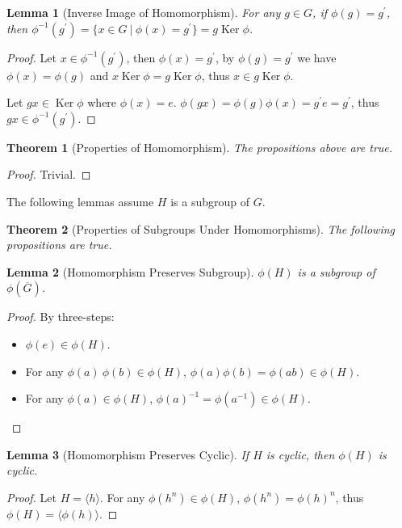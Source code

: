 \documentclass[14pt]{extarticle}
\newtheorem{theorem}{Theorem}[section]
\newtheorem{lemma}{Lemma}[section]
\DeclareMathOperator{\Ker}{Ker}
\newcommand{\inv}[1]{#1^{-1}}
\newcommand{\1}{\{e\}}
\begin{document}
\begin{lemma}[Inverse Image of Homomorphism]
  For any $g \in G$, if $\phi(g) = g^\prime$, 
  then $\inv{\phi}(g^\prime) = \{ x \in G \ | \ \phi(x) = g^\prime \} = g \Ker \phi$.
\end{lemma}
\begin{proof}
  Let $x \in \inv{\phi}(g^\prime)$, 
  then $\phi(x) = g^\prime$, 
  by $\phi(g) = g^\prime$
  we have $\phi(x) = \phi(g)$
  and $x \Ker \phi = g \Ker \phi$,
  thus $x \in g \Ker \phi$.

  Let $gx \in \Ker \phi$ where $\phi(x) = e$.
  $\phi(gx) = \phi(g)\phi(x) = g^\prime e = g^\prime$,
  thus $gx \in \inv{\phi}(g^\prime)$.
\end{proof}

\begin{theorem}[Properties of Homomorphism]
  The propositions above are true.
\end{theorem}
\begin{proof}
  Trivial.
\end{proof}

The following lemmas assume $H$ is a subgroup of $G$.

\begin{theorem}[Properties of Subgroups Under Homomorphisms]
  The following propositions are true.
\end{theorem}

\begin{lemma}[Homomorphism Preserves Subgroup]
  $\phi(H)$ is a subgroup of $\phi(\overline{G})$.
\end{lemma}
\begin{proof}
  By three-steps:

  \begin{itemize}
    \item $\phi(e) \in \phi(H)$.
    \item For any $\phi(a) \ \phi(b) \in \phi(H)$, $\phi(a)\phi(b) = \phi(ab) \in \phi(H)$.
    \item For any $\phi(a) \in \phi(H)$, $\inv{\phi(a)} = \phi(\inv{a}) \in \phi(H)$.
  \end{itemize}
\end{proof}

\begin{lemma}[Homomorphism Preserves Cyclic]
  If $H$ is cyclic, then $\phi(H)$ is cyclic.
\end{lemma}
\begin{proof}
  Let $H = \langle h \rangle$. 
  For any $\phi(h^n) \in \phi(H)$,
  $\phi(h^n) = \phi(h)^n$, thus $\phi(H) = \langle \phi(h) \rangle$.
\end{proof}
\end{document}

